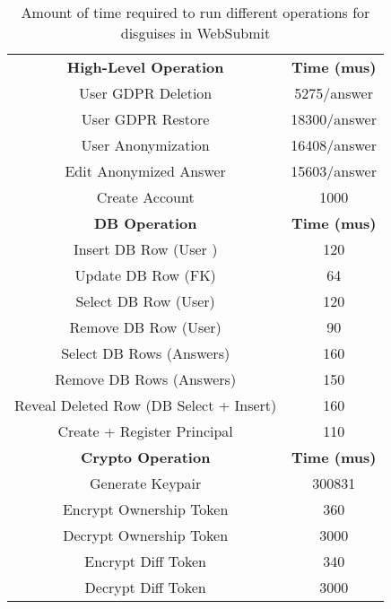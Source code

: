 \begin{table}
\begin{center}
\begin{tabular}{ c c }
 \textbf{High-Level Operation} & \textbf{Time (mus)}\\
    User GDPR Deletion & 5275/answer\\
    User GDPR Restore & 18300/answer\\
    User Anonymization & 16408/answer\\
    Edit Anonymized Answer & 15603/answer \\
    Create Account & 1000\\
\hline
    \textbf{DB Operation} & \textbf{Time (mus)}\\
\hline
Insert DB Row (User )& 120\\
Update DB Row (FK) & 64\\ 
Select DB Row (User) & 120\\
Remove DB Row (User) & 90\\
Select DB Rows (Answers) & 160\\
Remove DB Rows (Answers) & 150\\
Reveal Deleted Row (DB Select + Insert) & 160 \\
Create + Register Principal & 110\\
\hline
    \textbf{Crypto Operation} & \textbf{Time (mus)}\\
\hline
Generate Keypair & 300831\\
Encrypt Ownership Token & 360\\
Decrypt Ownership Token & 3000\\
Encrypt Diff Token & 340\\
Decrypt Diff Token & 3000\\
\end{tabular}
\end{center}
\caption{Amount of time required to run different operations for disguises in WebSubmit}
\end{table}
